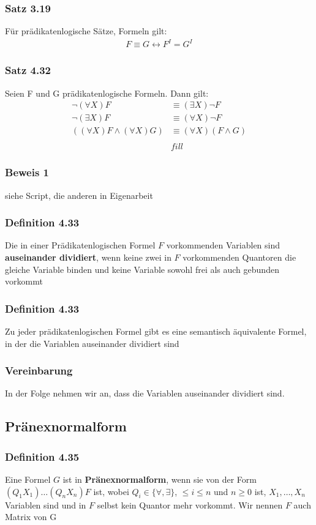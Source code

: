 \subsubsection{Satz 3.19}
Für prädikatenlogische Sätze, Formeln gilt:
\begin{align*}
F \equiv G \leftrightarrow F^I = G^I
\end{align*}
\subsubsection{Satz 4.32}
Seien F und G prädikatenlogische Formeln. Dann gilt:
\begin{align*}
\neg(\forall X)F&\equiv (\exists X)\neg F \\
\neg(\exists X)F &\equiv (\forall X)\neg F \\
((\forall X) F \wedge (\forall X)G) &\equiv (\forall X)(F\wedge G)\\
\\
&fill
\end{align*}
\subsubsection{Beweis 1}
siehe Script, die anderen in Eigenarbeit
\subsubsection{Definition 4.33}
Die in einer Prädikatenlogischen Formel \(F\) vorkommenden Variablen sind \textbf{auseinander dividiert}, wenn keine zwei in \(F\) vorkommenden Quantoren die gleiche Variable binden und keine Variable sowohl frei als auch gebunden vorkommt
\subsubsection{Definition 4.33}
Zu jeder prädikatenlogischen Formel gibt es eine semantisch äquivalente Formel, in der die Variablen auseinander dividiert sind
\subsubsection{Vereinbarung}
In der Folge nehmen wir an, dass die Variablen auseinander dividiert sind.
\subsection{Pränexnormalform}
\subsubsection{Definition 4.35} 
Eine Formel \(G\) ist in \textbf{Pränexnormalform}, wenn sie von der Form \((Q_1 X_1)\ldots (Q_n X_n)F \) ist, wobei \(Q_i \in \{\forall,\exists\}\), \(\le i \le n\) und \(n \ge 0 \) ist, \(X_1, \ldots , X_n\) Variablen sind und in \(F\) selbst kein Quantor mehr vorkommt. Wir nennen \(F\) auch Matrix von G
